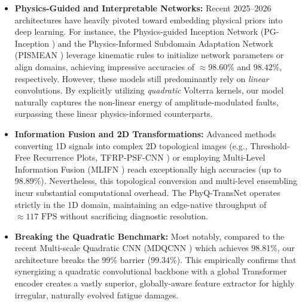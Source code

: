 \documentclass[5p,times,twocolumn]{elsarticle}
\begin{document}
\begin{itemize}
    \item \textbf{Physics-Guided and Interpretable Networks:} Recent 2025--2026 architectures have heavily pivoted toward embedding physical priors into deep learning. For instance, the Physics-guided Inception Network (PG-Inception \cite{Ref_Wu_TIM_2026}) and the Physics-Informed Subdomain Adaptation Network (PISMEAN \cite{Ref_Liu_AEI_2025}) leverage kinematic rules to initialize network parameters or align domains, achieving impressive accuracies of $\approx 98.60\%$ and $98.42\%$, respectively. However, these models still predominantly rely on \textit{linear} convolutions. By explicitly utilizing \textit{quadratic} Volterra kernels, our model naturally captures the non-linear energy of amplitude-modulated faults, surpassing these linear physics-informed counterparts.
    
    \item \textbf{Information Fusion and 2D Transformations:} Advanced methods converting 1D signals into complex 2D topological images (e.g., Threshold-Free Recurrence Plots, TFRP-PSF-CNN \cite{Ref_Dong_MSSP_2025}) or employing Multi-Level Information Fusion (MLIFN \cite{Ref_Wang_AEI_2025}) reach exceptionally high accuracies (up to 98.89\%). Nevertheless, this topological conversion and multi-level ensembling incur substantial computational overhead. The PhyQ-TransNet operates strictly in the 1D domain, maintaining an edge-native throughput of $\approx 117 \text{ FPS}$ without sacrificing diagnostic resolution.
    
    \item \textbf{Breaking the Quadratic Benchmark:} Most notably, compared to the recent Multi-scale Quadratic CNN (MDQCNN \cite{Ref_Ji_MDQCNN}) which achieves 98.81\%, our architecture breaks the 99\% barrier (99.34\%). This empirically confirms that synergizing a quadratic convolutional backbone with a global Transformer encoder creates a vastly superior, globally-aware feature extractor for highly irregular, naturally evolved fatigue damages.
\end{itemize}
\end{document}
